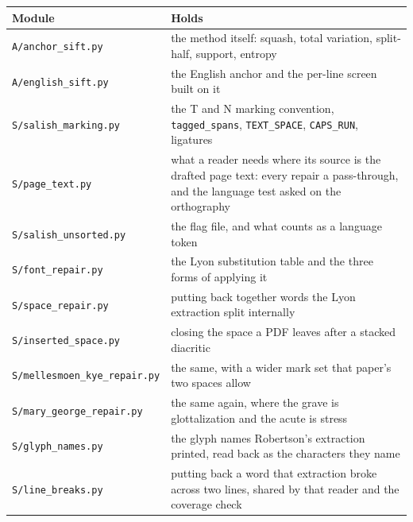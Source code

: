 \tiny
\setlength{\tabcolsep}{2pt}
\begin{longtable}{@{}>{\raggedright\arraybackslash}p{}>{\raggedright\arraybackslash}p{}@{}}
\toprule
Module & Holds \\
\midrule
\texttt{A/\allowbreak{}anchor\_\allowbreak{}sift.\allowbreak{}py} & the method itself: squash, total variation, split-half, support, entropy \\
\texttt{A/\allowbreak{}english\_\allowbreak{}sift.\allowbreak{}py} & the English anchor and the per-line screen built on it \\
\texttt{S/\allowbreak{}salish\_\allowbreak{}marking.\allowbreak{}py} & the T and N marking convention, \texttt{tagged\_\allowbreak{}spans}, \texttt{TEXT\_\allowbreak{}SPACE}, \texttt{CAPS\_\allowbreak{}RUN}, ligatures \\
\texttt{S/\allowbreak{}page\_\allowbreak{}text.\allowbreak{}py} & what a reader needs where its source is the drafted page text: every repair a pass-through, and the language test asked on the orthography \\
\texttt{S/\allowbreak{}salish\_\allowbreak{}unsorted.\allowbreak{}py} & the flag file, and what counts as a language token \\
\texttt{S/\allowbreak{}font\_\allowbreak{}repair.\allowbreak{}py} & the Lyon substitution table and the three forms of applying it \\
\texttt{S/\allowbreak{}space\_\allowbreak{}repair.\allowbreak{}py} & putting back together words the Lyon extraction split internally \\
\texttt{S/\allowbreak{}inserted\_\allowbreak{}space.\allowbreak{}py} & closing the space a PDF leaves after a stacked diacritic \\
\texttt{S/\allowbreak{}mellesmoen\_\allowbreak{}kye\_\allowbreak{}repair.\allowbreak{}py} & the same, with a wider mark set that paper's two spaces allow \\
\texttt{S/\allowbreak{}mary\_\allowbreak{}george\_\allowbreak{}repair.\allowbreak{}py} & the same again, where the grave is glottalization and the acute is stress \\
\texttt{S/\allowbreak{}glyph\_\allowbreak{}names.\allowbreak{}py} & the glyph names Robertson's extraction printed, read back as the characters they name \\
\texttt{S/\allowbreak{}line\_\allowbreak{}breaks.\allowbreak{}py} & putting back a word that extraction broke across two lines, shared by that reader and the coverage check \\

\end{longtable}
